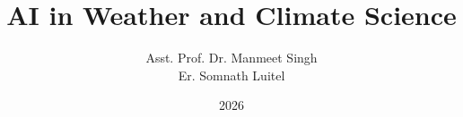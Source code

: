 \documentclass[12pt, twoside, openright]{book}
\begin{document}
\frontmatter
\title{\textbf{AI in Weather and Climate Science}}
\author{Asst. Prof. Dr. Manmeet Singh\\Er. Somnath Luitel}
\date{2026}
\maketitle
\tableofcontents

\mainmatter













\end{document}
